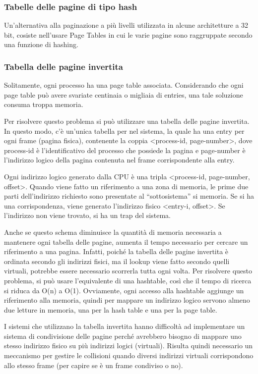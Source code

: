 \documentclass[a4paper]{article}
\begin{document}
\subsubsection{Tabelle delle pagine di tipo hash}
Un'alternativa alla paginazione a più livelli utilizzata in alcune architetture a 32 bit, cosiste nell'usare Page Tables in cui le varie pagine sono raggruppate secondo una funzione di hashing.

\subsubsection{Tabella delle pagine invertita}
Solitamente, ogni processo ha una page table associata. Considerando che ogni page table può avere svariate centinaia o migliaia di entries, una tale soluzione consuma troppa memoria.

Per risolvere questo problema si può utilizzare una tabella delle pagine invertita. In questo modo, c'è un'unica tabella per nel sistema, la quale ha una entry per ogni frame (pagina fisica), contenente la coppia <process-id, page-number>, dove process-id è l'identificativo del processo che possiede la pagina e page-number è l'indirizzo logico della pagina contenuta nel frame corrispondente alla entry.

Ogni indirizzo logico generato dalla CPU è una tripla <process-id, page-number, offset>. Quando viene fatto un riferimento a una zona di memoria, le prime due parti dell'indirizzo richiesto sono presentate al ``sottosistema'' si memoria. Se si ha una corrispondenza, viene generato l'indirizzo fisico <entry-i, offset>. Se l'indirizzo non viene trovato, si ha un trap del sistema.

Anche se questo schema diminuisce la quantità di memoria necessaria a mantenere ogni tabella delle pagine, aumenta il tempo necessario per cercare un riferimento a una pagina. Infatti, poiché la tabella delle pagine invertita è ordinata secondo gli indirizzi fisici, ma il lookup viene fatto secondo quelli virtuali, potrebbe essere necessario scorrerla tutta ogni volta. Per risolvere questo problema, si può usare l'equivalente di una hashtable, così che il tempo di ricerca si riduca da O(n) a O(1). Ovviamente, ogni accesso alla hashtable aggiunge un riferimento alla memoria, quindi per mappare un indirizzo logico servono almeno due letture in memoria, una per la hash table e una per la page table.

I sistemi che utilizzano la tabella invertita hanno difficoltà ad implementare un sistema di condivisione delle pagine perché avrebbero bisogno di mappare uno stesso indirizzo fisico su più indirizzi logici (virtuali). Risulta quindi necessario un meccanismo per gestire le collisioni quando diversi indirizzi virtuali corrispondono allo stesso frame (per capire se è un frame condiviso o no).
\end{document}
